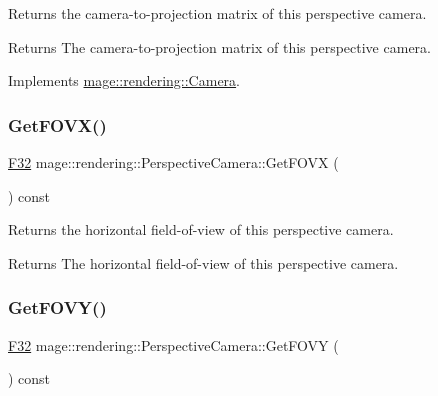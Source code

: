 Returns the camera-\/to-\/projection matrix of this perspective camera.

\begin{DoxyReturn}{Returns}
The camera-\/to-\/projection matrix of this perspective camera. 
\end{DoxyReturn}


Implements \mbox{\hyperlink{classmage_1_1rendering_1_1_camera_a08481175c3718a24333b22176e240d44}{mage\+::rendering\+::\+Camera}}.

\mbox{\label{classmage_1_1rendering_1_1_perspective_camera_a3308ee4d7ec6830c04ed3f4fc01f81ac}} 
\subsubsection{\texorpdfstring{Get\+F\+O\+V\+X()}{GetFOVX()}}
{\footnotesize\ttfamily \mbox{\hyperlink{namespacemage_aa97e833b45f06d60a0a9c4fc22ae02c0}{F32}} mage\+::rendering\+::\+Perspective\+Camera\+::\+Get\+F\+O\+VX (\begin{DoxyParamCaption}{ }\end{DoxyParamCaption}) const\hspace{0.3cm}{\ttfamily [noexcept]}}

Returns the horizontal field-\/of-\/view of this perspective camera.

\begin{DoxyReturn}{Returns}
The horizontal field-\/of-\/view of this perspective camera. 
\end{DoxyReturn}
\mbox{\label{classmage_1_1rendering_1_1_perspective_camera_ae6be4458a427e626ec7299c5898ffd38}} 
\subsubsection{\texorpdfstring{Get\+F\+O\+V\+Y()}{GetFOVY()}}
{\footnotesize\ttfamily \mbox{\hyperlink{namespacemage_aa97e833b45f06d60a0a9c4fc22ae02c0}{F32}} mage\+::rendering\+::\+Perspective\+Camera\+::\+Get\+F\+O\+VY (\begin{DoxyParamCaption}{ }\end{DoxyParamCaption}) const\hspace{0.3cm}{\ttfamily [noexcept]}}

